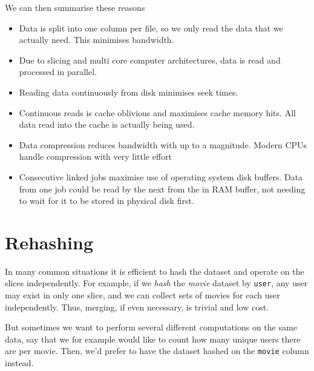 \documentclass[a4paper]{article}
\begin{document}
We can then summarise these reasons
\begin{itemize}
  \item[] Data is split into one column per file, so we only read the
    data that we actually need.  This minimises bandwidth.
    
  \item[] Due to slicing and multi core computer architectures, data
    is read and processed in parallel.

  \item[] Reading data continuously from disk minimises seek times.

  \item[] Continuous reads is cache oblivious and maximises cache
    memory hits. All data read into the cache is actually being used.

  \item[] Data compression reduces bandwidth with up to a magnitude.
    Modern CPUs handle compression with very little effort

  \item[] Consecutive linked jobs maximise use of operating system
    disk buffers.  Data from one job could be read by the next from
    the in RAM buffer, not needing to wait for it to be stored in
    physical disk first.
\end{itemize}













\clearpage


\section{Rehashing}

In many common situations it is efficient to hash the dataset and
operate on the slices independently.  For example, if we \textsl{hash}
the \textsl{movie} dataset by \texttt{user}, any user may exist in
only one slice, and we can collect sets of movies for each user
independently.  Thus, merging, if even necessary, is trivial and low
cost.

But sometimes we want to perform several different computations on the
same data, say that we for example would like to count how many unique
users there are per movie.  Then, we'd prefer to have the dataset
hashed on the \texttt{movie} column instead.
\end{document}
